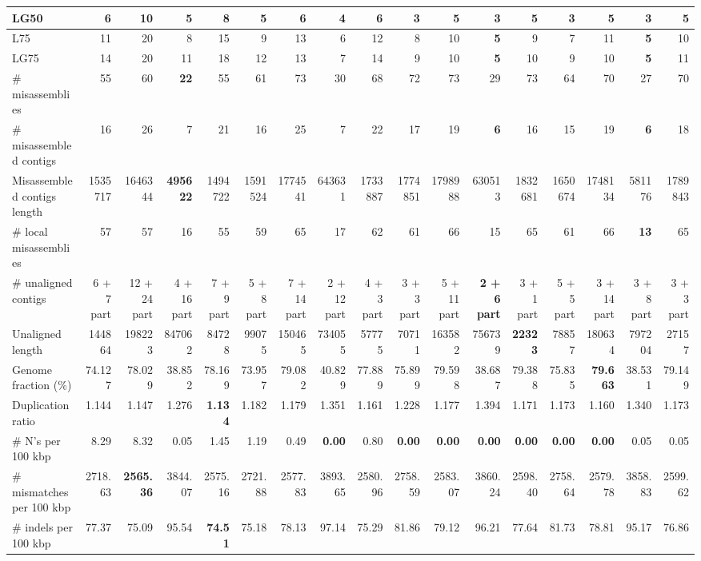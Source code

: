 \documentclass[12pt,a4paper]{article}
\begin{document}
\begin{table}[ht]
\begin{center}
\begin{tabular}{|l*{16}{|r}|}
LG50 & 6 & 10 & 5 & 8 & 5 & 6 & 4 & 6 & {\bf 3} & 5 & {\bf 3} & 5 & {\bf 3} & 5 & {\bf 3} & 5 \\ \hline
L75 & 11 & 20 & 8 & 15 & 9 & 13 & 6 & 12 & 8 & 10 & {\bf 5} & 9 & 7 & 11 & {\bf 5} & 10 \\ \hline
LG75 & 14 & 20 & 11 & 18 & 12 & 13 & 7 & 14 & 9 & 10 & {\bf 5} & 10 & 9 & 10 & {\bf 5} & 11 \\ \hline
\# misassemblies & 55 & 60 & {\bf 22} & 55 & 61 & 73 & 30 & 68 & 72 & 73 & 29 & 73 & 64 & 70 & 27 & 70 \\ \hline
\# misassembled contigs & 16 & 26 & 7 & 21 & 16 & 25 & 7 & 22 & 17 & 19 & {\bf 6} & 16 & 15 & 19 & {\bf 6} & 18 \\ \hline
Misassembled contigs length & 1535717 & 1646344 & {\bf 495622} & 1494722 & 1591524 & 1774541 & 643631 & 1733887 & 1774851 & 1798988 & 630513 & 1832681 & 1650674 & 1748134 & 581176 & 1789843 \\ \hline
\# local misassemblies & 57 & 57 & 16 & 55 & 59 & 65 & 17 & 62 & 61 & 66 & 15 & 65 & 61 & 66 & {\bf 13} & 65 \\ \hline
\# unaligned contigs & 6 + 7 part & 12 + 24 part & 4 + 16 part & 7 + 9 part & 5 + 8 part & 7 + 14 part & 2 + 12 part & 4 + 3 part & 3 + 3 part & 5 + 11 part & {\bf 2 + 6 part} & 3 + 1 part & 5 + 5 part & 3 + 14 part & 3 + 8 part & 3 + 3 part \\ \hline
Unaligned length & 144864 & 198223 & 847062 & 84728 & 99075 & 150465 & 734055 & 57775 & 70711 & 163582 & 756739 & {\bf 22323} & 78857 & 180634 & 797204 & 27157 \\ \hline
Genome fraction (\%) & 74.127 & 78.029 & 38.852 & 78.169 & 73.957 & 79.082 & 40.829 & 77.889 & 75.899 & 79.598 & 38.687 & 79.388 & 75.835 & {\bf 79.663} & 38.531 & 79.149 \\ \hline
Duplication ratio & 1.144 & 1.147 & 1.276 & {\bf 1.134} & 1.182 & 1.179 & 1.351 & 1.161 & 1.228 & 1.177 & 1.394 & 1.171 & 1.173 & 1.160 & 1.340 & 1.173 \\ \hline
\# N's per 100 kbp & 8.29 & 8.32 & 0.05 & 1.45 & 1.19 & 0.49 & {\bf 0.00} & 0.80 & {\bf 0.00} & {\bf 0.00} & {\bf 0.00} & {\bf 0.00} & {\bf 0.00} & {\bf 0.00} & 0.05 & 0.05 \\ \hline
\# mismatches per 100 kbp & 2718.63 & {\bf 2565.36} & 3844.07 & 2575.16 & 2721.88 & 2577.83 & 3893.65 & 2580.96 & 2758.59 & 2583.07 & 3860.24 & 2598.40 & 2758.64 & 2579.78 & 3858.83 & 2599.62 \\ \hline
\# indels per 100 kbp & 77.37 & 75.09 & 95.54 & {\bf 74.51} & 75.18 & 78.13 & 97.14 & 75.29 & 81.86 & 79.12 & 96.21 & 77.64 & 81.73 & 78.81 & 95.17 & 76.86 \\ \hline

\end{tabular}
\end{center}
\end{table}
\end{document}
